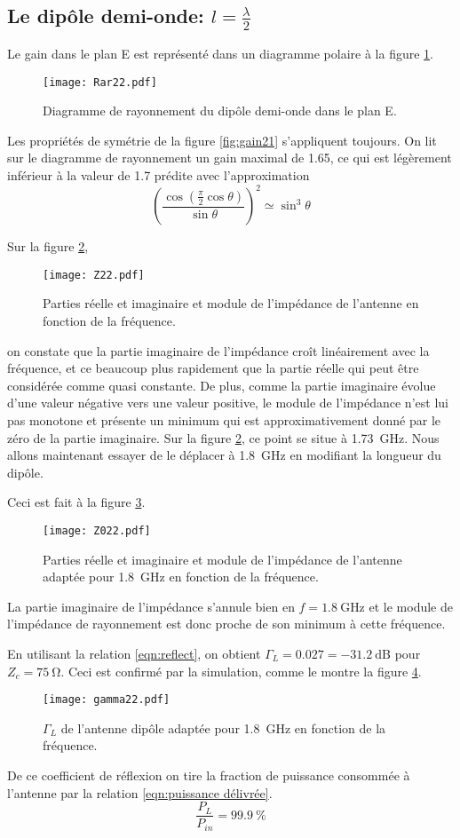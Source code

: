 \subsection{Le dipôle demi-onde: $l = \frac{\lambda}{2}$}
\label{subsec:demionde}
Le gain dans le plan E est représenté dans un diagramme polaire à la figure \ref{fig:gain22}.
\begin{figure}[htbp]
  \centering
  \texttt{[image: Rar22.pdf]}
  \caption{Diagramme de rayonnement du dipôle demi-onde dans le plan E.\label{fig:gain22}}
\end{figure}
Les propriétés de symétrie de la figure \ref{fig:gain21} s'appliquent toujours. On lit sur le diagramme de rayonnement un gain maximal de \num{1.65}, ce qui est légèrement inférieur à la valeur de \num{1.7} prédite avec l'approximation
\[\left ( \frac{\cos(\frac{\pi}{2}\cos\theta)}{\sin\theta} \right ) ^2 \simeq \sin^3 \theta\]

Sur la figure \ref{fig:Z22},
\begin{figure}[htbp]
  \centering
  \texttt{[image: Z22.pdf]}
  \caption{Parties réelle et imaginaire et module de l'impédance de l'antenne en fonction de la fréquence.\label{fig:Z22}}
\end{figure}
on constate que la partie imaginaire de l'impédance croît linéairement avec la fréquence, et ce beaucoup plus rapidement que la partie réelle qui peut être considérée comme quasi constante. De plus, comme la partie imaginaire évolue d'une valeur négative vers une valeur positive, le module de l'impédance n'est lui pas monotone et présente un minimum qui est approximativement donné par le zéro de la partie imaginaire. Sur la figure \ref{fig:Z22}, ce point se situe à \SI{1.73}{\giga\hertz}. Nous allons maintenant essayer de le déplacer à \SI{1.8}{\giga\hertz} en modifiant la longueur du dipôle.

Ceci est fait à la figure \ref{fig:Z022}.
\begin{figure}[htbp]
  \centering
  \texttt{[image: Z022.pdf]}
  \caption{Parties réelle et imaginaire et module de l'impédance de l'antenne adaptée pour \SI{1.8}{\giga\hertz} en fonction de la fréquence.\label{fig:Z022}}
\end{figure}
La partie imaginaire de l'impédance s'annule bien en $f = \SI{1.8}{\giga\hertz}$ et le module de l'impédance de rayonnement est donc proche de son minimum à cette fréquence.

En utilisant la relation \ref{eqn:reflect}, on obtient $\Gamma_L = 0.027 = \SI{-31.2}{\deci\bel}$ pour $Z_c = \SI{75}{\ohm}$. Ceci est confirmé par la simulation, comme le montre la figure \ref{fig:gamma22}.
\begin{figure}[htbp]
  \centering
  \texttt{[image: gamma22.pdf]}
  \caption{$\Gamma_L$ de l'antenne dipôle adaptée pour \SI{1.8}{\giga\hertz} en fonction de la fréquence.\label{fig:gamma22}}
\end{figure}
De ce coefficient de réflexion on tire la fraction de puissance consommée à l'antenne par la relation \ref{eqn:puissance délivrée}.
\[
  \frac{P_L}{P_{in}} = \SI{99.9}{\percent}
\]

